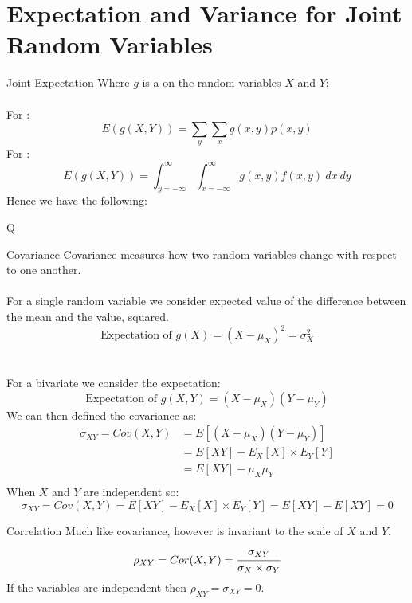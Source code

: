 \section{Expectation and Variance for Joint Random Variables}
\begin{definitionbox}{Joint Expectation}
	Where $g$ is a  on the random variables $X$ and $Y$:
	\\
	\\ For :
	\[E(g(X,Y)) = \sum_{y}\sum_{x}g(x,y)p(x,y)\]
	For :
	\[E(g(X,Y)) = \int_{y = -\infty}^{\infty} \int_{x=-\infty}^{\infty} g(x,y) f(x,y) \ dx \ dy\]
	Hence we have the following:
	\begin{itemize}
    \end{itemize}Q
\end{definitionbox}

\begin{definitionbox}{Covariance}
Covariance measures how two random variables change with respect to one another.
\\
\\ For a single random variable we consider expected value of the difference between the mean and the value, squared.
\[\text{Expectation of } g(X) = (X - \mu_X)^2 = \sigma_X^2\]
\\
\\ For a bivariate we consider the expectation:
\[\text{Expectation of } g(X, Y) = (X - \mu_X)(Y - \mu_Y)\]
We can then defined the covariance as:
\[\begin{split}
		\sigma_{XY} = Cov(X, Y) & = E[(X - \mu_X)(Y - \mu_Y)] \\
		& = E[XY] - E_X[X] \times E_Y[Y] \\
		& = E[XY] - \mu_X\mu_Y \\
	\end{split}\]
When $X$ and $Y$ are independent so:
\[\sigma_{XY} = Cov(X, Y) = E[XY] - E_X[X] \times E_Y[Y] = E[XY] - E[XY] = 0\]
\end{definitionbox}

\begin{definitionbox}{Correlation}
	Much like covariance, however is invariant to the scale of $X$ and $Y$.
	\[\rho_{XY} = Cor(X,Y) = \cfrac{\sigma_{XY}}{\sigma_X \times \sigma_Y}\]
	If the variables are independent then $\rho_{XY} = \sigma_{XY} = 0$.
\end{definitionbox}


